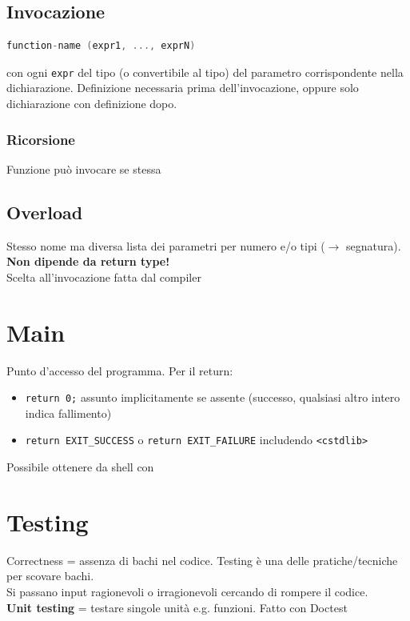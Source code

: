 \documentclass[10pt, oneside]{book}
\begin{document}
\subsection{Invocazione}
\begin{lstlisting}[language=C++]
function-name (expr1, ..., exprN)
\end{lstlisting}
con ogni \texttt{expr} del tipo (o convertibile al tipo) del parametro corrispondente nella dichiarazione. Definizione necessaria prima dell'invocazione, oppure solo dichiarazione con definizione dopo.\\
\subsubsection{Ricorsione}
Funzione può invocare se stessa

\subsection{Overload}
Stesso nome ma diversa lista dei parametri per numero e/o tipi ($\rightarrow$ segnatura). \textbf{Non dipende da return type!}\\
Scelta all'invocazione fatta dal compiler

\section{Main}
Punto d'accesso del programma. Per il return:
\begin{itemize}
\item \texttt{return 0;} assunto implicitamente se assente (successo, qualsiasi altro intero indica fallimento)
\item \texttt{return EXIT\_SUCCESS} o \texttt{return EXIT\_FAILURE} includendo \texttt{<cstdlib>}
\end{itemize}
Possibile ottenere da shell con 

\section{Testing}
Correctness = assenza di bachi nel codice. Testing è una delle pratiche/tecniche per scovare bachi.\\
Si passano input ragionevoli o irragionevoli cercando di rompere il codice.\\
\textbf{Unit testing} = testare singole unità e.g. funzioni. Fatto con Doctest
\end{document}

